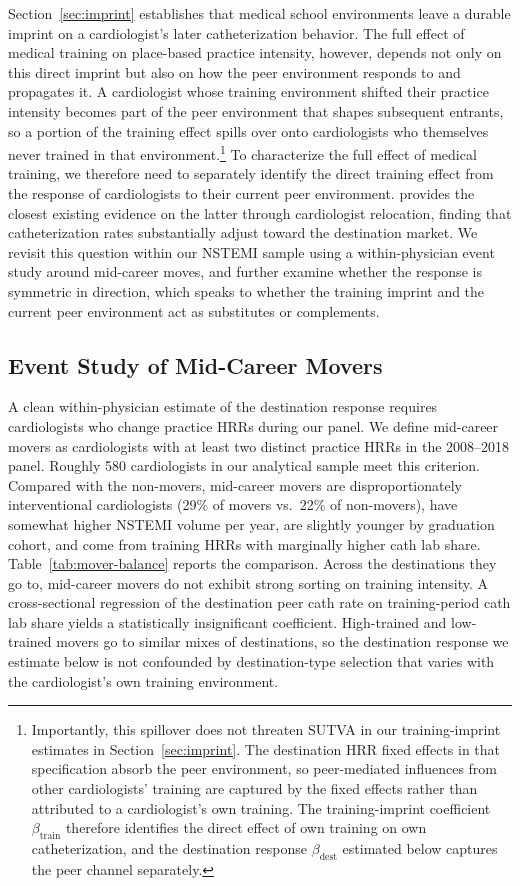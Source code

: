 \documentclass[12pt]{article}
\let\textcite\citet
\begin{document}
Section~\ref{sec:imprint} establishes that medical school environments leave a durable imprint on a cardiologist's later catheterization behavior. The full effect of medical training on place-based practice intensity, however, depends not only on this direct imprint but also on how the peer environment responds to and propagates it. A cardiologist whose training environment shifted their practice intensity becomes part of the peer environment that shapes subsequent entrants, so a portion of the training effect spills over onto cardiologists who themselves never trained in that environment.\footnote{Importantly, this spillover does not threaten SUTVA in our training-imprint estimates in Section~\ref{sec:imprint}. The destination HRR fixed effects in that specification absorb the peer environment, so peer-mediated influences from other cardiologists' training are captured by the fixed effects rather than attributed to a cardiologist's own training. The training-imprint coefficient $\beta_{\text{train}}$ therefore identifies the direct effect of own training on own catheterization, and the destination response $\beta_{\text{dest}}$ estimated below captures the peer channel separately.} To characterize the full effect of medical training, we therefore need to separately identify the direct training effect from the response of cardiologists to their current peer environment. \textcite{molitor2018} provides the closest existing evidence on the latter through cardiologist relocation, finding that catheterization rates substantially adjust toward the destination market. We revisit this question within our NSTEMI sample using a within-physician event study around mid-career moves, and further examine whether the response is symmetric in direction, which speaks to whether the training imprint and the current peer environment act as substitutes or complements.

\subsection{Event Study of Mid-Career Movers}\label{sec:dest-sample}

A clean within-physician estimate of the destination response requires cardiologists who change practice HRRs during our panel. We define mid-career movers as cardiologists with at least two distinct practice HRRs in the 2008--2018 panel. Roughly 580 cardiologists in our analytical sample meet this criterion. Compared with the non-movers, mid-career movers are disproportionately interventional cardiologists (29\% of movers vs.\ 22\% of non-movers), have somewhat higher NSTEMI volume per year, are slightly younger by graduation cohort, and come from training HRRs with marginally higher cath lab share. Table~\ref{tab:mover-balance} reports the comparison. Across the destinations they go to, mid-career movers do not exhibit strong sorting on training intensity. A cross-sectional regression of the destination peer cath rate on training-period cath lab share yields a statistically insignificant coefficient. High-trained and low-trained movers go to similar mixes of destinations, so the destination response we estimate below is not confounded by destination-type selection that varies with the cardiologist's own training environment.
\end{document}

